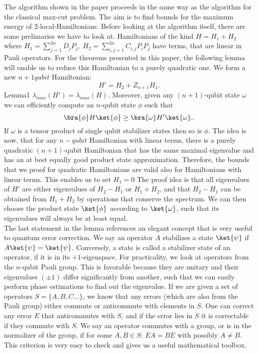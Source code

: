 The algorithm shown in the paper proceeds in the same way as the algorithm for the classical max-cut problem.
The aim is to find bounds for the maximum energy of $2$-local-Hamiltonians.
Before looking at the algorithm itself, there are some prelimaries we have to look at.
Hamiltonians of the kind $H = H_1+H_2$ where $H_1 = \sum_{j=1}^{3n} D_jP_j, ~ H_2  = \sum_{i,j=1}^{3n} C_{i,j}P_iP_j$ have terms, that are linear in Pauli operators.
For the theorems presented in this paper, the following lemma will enable us to reduce this Hamiltonian to a purely quadratic one.
We form a new $n+1 qubit$ Hamiltonian: \[
H'=H_2+Z_{n+1}H_1
.\]
Lemma1
	$\lambda_{max}\left( H' \right) =\lambda_{max}\left( H \right)$. Moreover, given any $(n+1)$-qubit state  $\omega$ we can efficiently compute an $n$-qubit state $\phi$ such that \[
	\bra{\phi}H\ket{\phi} \ge \bra{\omega}H'\ket{\omega}.
	.\]
If $\omega$ is a tensor product of single qubit stabilizer states then so is $\phi$.
The idea is now, that for any $n-qubit$ Hamiltonian with linear terms, there is a purely quadratic $(n+1)$-qubit Hamiltonian that has the same maximal eigenvalue and has an at best equally good product state approximation.
Therefore, the bounds that we proof for quadratic Hamiltonians are valid also for Hamiltonians with linear terms.
This enables us to set $H_1=0$
The proof idea is that all eigenvalues of $H'$ are either eigenvalues of $H_2-H_1$ or $H_1+H_2$, and that $H_2-H_1$ can be obtained from $H_1+H_2$ by operations that conserve the spectrum.
We can then choose the product state $\ket{\phi}$ according to $\ket{\omega}$, such that its eigenvalues will always be at least equal.  \\
The last statement in the lemma references an elegant concept that is very useful to quantum error correction.
We say an operator $A$ stabilizes a state $\ket{\psi}$ if $A\ket{\psi}=\ket{\psi}$.
Conversely, a state is called a stabilizer state of an operator, if it is in its $+1$-eigenspace.
For practicality, we look at operators from the $n$-qubit Pauli group.
This is favorable because they are unitary and their eigenvalues  $(\pm 1)$ differ significantly from another, such that we can easily perform phase estimations to find out the eigenvalue.
If we are given a set of operators $S=\{A,B,C\ldots\}$, we know that any errors (which are also from the Pauli group) either commute or anticommute with elements in $S$.
One can correct any error $E$ that anticommutes with $S$, and if the error lies in $S$ it is correctable if they commute with $S$.\cite{gottesman97}
We say an operator commutes with a group, or is in the normalizer of the group, if for some $A,B\in S$: $EA=BE$ with possibly $A\neq B$.
This criterion is very easy to check and gives us a useful mathematical toolbox. \\


